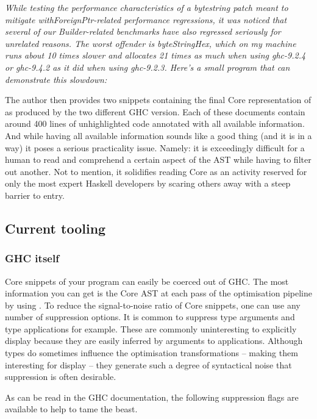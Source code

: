 \textit{While testing the performance characteristics of a bytestring patch meant to mitigate withForeignPtr-related performance regressions,
it was noticed that several of our Builder-related benchmarks have also regressed seriously for unrelated reasons.
The worst offender is byteStringHex, which on my machine runs about 10 times slower and allocates 21 times as much when using ghc-9.2.4 or ghc-9.4.2
as it did when using ghc-9.2.3. Here's a small program that can demonstrate this slowdown:}
\hfill \break

The author then provides two snippets containing the final Core representation of  as produced by the two different GHC version.
Each of these documents contain around 400 lines of unhighlighted code annotated with all available information. And while having all available information
sounds like a good thing (and it is in a way) it poses a serious practicality issue.
Namely: it is exceedingly difficult for a human to read and comprehend a certain aspect of the AST while having to filter out another.
Not to mention, it solidifies reading Core as an activity reserved for only the most expert Haskell developers by scaring others away with
a steep barrier to entry.

\subsection{Current tooling}

\subsubsection{GHC itself}
\label{section:background:ghc}


Core snippets of your program can easily be coerced out of GHC. The most information you can get
is the Core AST at each pass of the optimisation pipeline by using .
To reduce the signal-to-noise ratio of Core snippets, one can use any number of suppression options.
It is common to suppress type arguments and type applications for example. These are commonly
uninteresting to explicitly display because they are easily inferred by arguments to applications.
Although types do sometimes influence the optimisation transformations -- making them interesting for display -- 
they generate such a degree of syntactical noise that suppression is often desirable.

As can be read in the GHC documentation, the following suppression flags are available to help to tame the beast.


